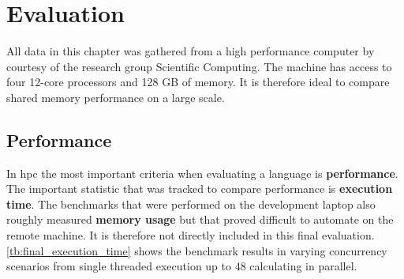 \chapter{Evaluation}
\label{ch:Evaluation}


All data in this chapter was gathered from a high performance computer by courtesy of the research group Scientific Computing. The machine has access to four 12-core processors and 128 GB of memory. It is therefore ideal to compare shared memory performance on a large scale.

\section{Performance}
\label{sec:Evaluation::Performance}

In \acrlong{hpc} the most important criteria when evaluating a language is \textbf{performance}. The important statistic that was tracked to compare performance is \textbf{execution time}. The benchmarks that were performed on the development laptop also roughly measured \textbf{memory usage} but that proved difficult to automate on the remote machine. It is therefore not directly included in this final evaluation. \autoref{tb:final_execution_time} shows the benchmark results in varying concurrency scenarios from single threaded execution up to 48 calculating in parallel.

